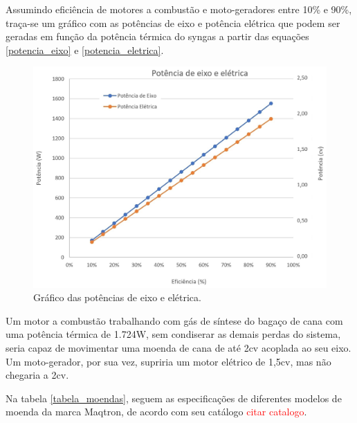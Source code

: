 Assumindo eficiência de motores a combustão e moto-geradores entre 10\% e 90\%, traça-se um gráfico com as potências de eixo e potência elétrica que podem ser geradas em função da potência térmica do syngas a partir das equações \ref{potencia_eixo} e \ref{potencia_eletrica}.

\begin{figure}[!htb]
	\centering
	\includegraphics[width=13.5cm]{grafico_potencia_eficiencia}
	\caption{Gráfico das potências de eixo e elétrica.}
	\label{grafico_potencia_eficiencia}
\end{figure}

Um motor a combustão trabalhando com gás de síntese do bagaço de cana com uma potência térmica de 1.724W, sem condiserar as demais perdas do sistema, seria capaz de movimentar uma moenda de cana de até 2cv acoplada ao seu eixo. Um moto-gerador, por sua vez, supriria um motor elétrico de 1,5cv, mas não chegaria a 2cv.

Na tabela \ref{tabela_moendas}, seguem as especificações de diferentes modelos de moenda da marca Maqtron, de acordo com seu catálogo \textcolor{red}{citar catalogo}.

